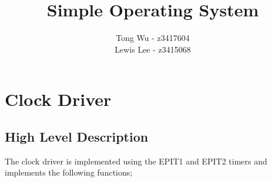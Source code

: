 \documentclass[12pt]{article}
\begin{document}
\pagestyle{myheadings}

\title{Simple Operating System}
\author{Tong Wu - z3417604\\Lewis Lee - z3415068}

\maketitle

\section{Clock Driver}
\subsection{High Level Description}
The clock driver is implemented using the EPIT1 and EPIT2 timers and implements the following functions;
\end{document}
